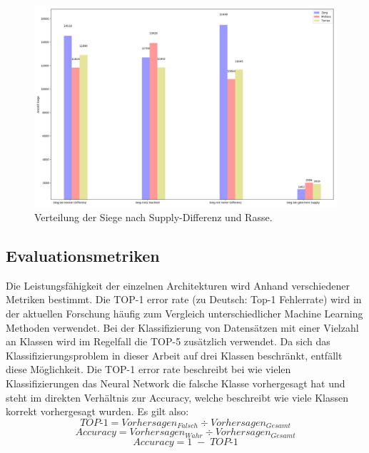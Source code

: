 \begin{figure}[H]
\centering
\includegraphics[scale=0.4]{pictures/Graph_Supp_Wins}
\caption{Verteilung der Siege nach Supply-Differenz und Rasse.}
\label{fig:siegsupp}
\end{figure}

\subsection{Evaluationsmetriken}
\label{Metriken}
Die Leistungsfähigkeit der einzelnen Architekturen wird Anhand verschiedener Metriken bestimmt. Die TOP-1 error rate (zu Deutsch: Top-1 Fehlerrate) wird in der aktuellen Forschung häufig zum Vergleich unterschiedlicher Machine Learning Methoden  verwendet. Bei der Klassifizierung von Datensätzen mit einer Vielzahl an Klassen wird im Regelfall die TOP-5 zusätzlich verwendet. Da sich das Klassifizierungsproblem in dieser Arbeit auf drei Klassen beschränkt, entfällt diese Möglichkeit. Die TOP-1 error rate beschreibt bei wie vielen Klassifizierungen das Neural Network die falsche Klasse vorhergesagt hat und steht im direkten Verhältnis zur Accuracy, welche beschreibt wie viele Klassen korrekt vorhergesagt wurden. Es gilt also:
\begin{equation}
TOP\text{-}1 = Vorhersagen_{Falsch} \div Vorhersagen_{Gesamt}
\end{equation}
\begin{equation}
Accuracy = Vorhersagen_{Wahr} \div Vorhersagen_{Gesamt}
\end{equation}
\begin{equation}
Accuracy = 1 \; - \; TOP\text{-}1
\end{equation}

